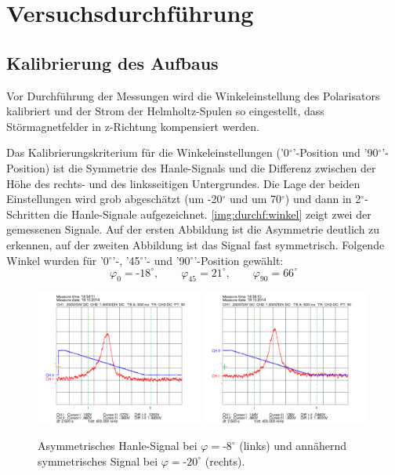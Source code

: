 \section{Versuchsdurchführung}

\subsection{Kalibrierung des Aufbaus}

Vor Durchführung der Messungen wird die Winkeleinstellung des Polarisators kalibriert
und der Strom der Helmholtz-Spulen so eingestellt,
dass Störmagnetfelder in z-Richtung kompensiert werden.

Das Kalibrierungskriterium für die Winkeleinstellungen ('0$^\circ$'-Position und '90$^\circ$'-Position)
ist die Symmetrie des Hanle-Signals und die Differenz zwischen
der Höhe des rechts- und des linksseitigen Untergrundes.
Die Lage der beiden Einstellungen wird grob abgeschätzt (um -20$^\circ$ und um 70$^\circ$)
und dann in 2$^\circ$-Schritten die Hanle-Signale aufgezeichnet.
\autoref{img:durchf:winkel} zeigt zwei der gemessenen
Signale. Auf der ersten Abbildung ist die Asymmetrie deutlich zu erkennen,
auf der zweiten Abbildung ist das Signal fast symmetrisch.
Folgende Winkel wurden für '0$^\circ$'-, '45$^\circ$'- und '90$^\circ$'-Position gewählt:
\begin{equation}
\label{eq:calang}
 \varphi_0=\text{-}18^\circ, \qquad \varphi_{45}=21^\circ, \qquad \varphi_{90}=66^\circ
\end{equation}
\begin{figure}[H]
\begin{center}
  \includegraphics[width=0.49\textwidth]{../data/1/-7_5.png}
  \includegraphics[width=0.49\textwidth]{../data/1/-20.png}
  \caption{Asymmetrisches Hanle-Signal bei $\varphi=\text{-}8^\circ$ (links) und
  annähernd symmetrisches Signal bei $\varphi=\text{-}20^\circ$ (rechts).}
  \label{img:durchf:winkel}
\end{center}
\end{figure}
